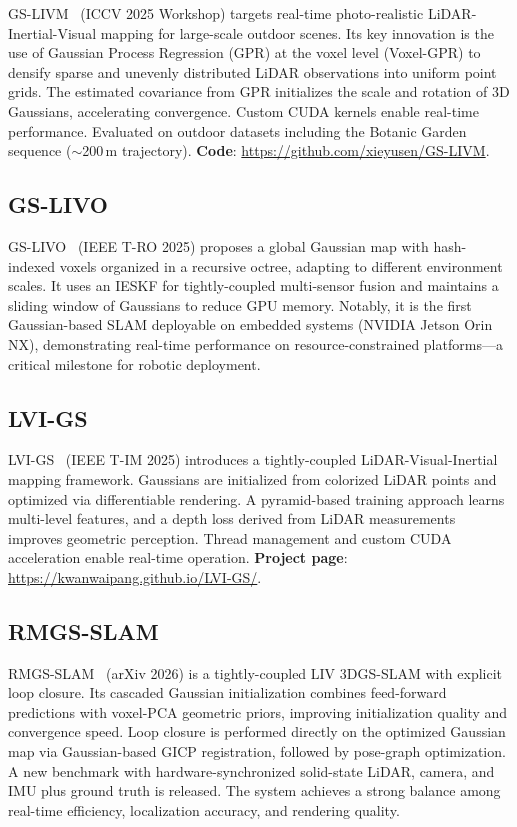 GS-LIVM~\cite{xie2024_gslivm} (ICCV 2025 Workshop) targets real-time
photo-realistic LiDAR-Inertial-Visual mapping for large-scale outdoor
scenes.  Its key innovation is the use of Gaussian Process Regression (GPR)
at the voxel level (Voxel-GPR) to densify sparse and unevenly distributed
LiDAR observations into uniform point grids.  The estimated covariance from
GPR initializes the scale and rotation of 3D Gaussians, accelerating
convergence.  Custom CUDA kernels enable real-time performance.  Evaluated
on outdoor datasets including the Botanic Garden sequence ($\sim$200\,m
trajectory).  \textbf{Code}: \url{https://github.com/xieyusen/GS-LIVM}.

\subsection{GS-LIVO}

GS-LIVO~\cite{hong2025_gslivo} (IEEE T-RO 2025) proposes a global Gaussian
map with hash-indexed voxels organized in a recursive octree, adapting to
different environment scales.  It uses an IESKF for tightly-coupled
multi-sensor fusion and maintains a sliding window of Gaussians to reduce
GPU memory.  Notably, it is the first Gaussian-based SLAM deployable on
embedded systems (NVIDIA Jetson Orin NX), demonstrating real-time performance
on resource-constrained platforms---a critical milestone for robotic
deployment.

\subsection{LVI-GS}

LVI-GS~\cite{zhao2025_lvigs} (IEEE T-IM 2025) introduces a
tightly-coupled LiDAR-Visual-Inertial mapping framework.  Gaussians are
initialized from colorized LiDAR points and optimized via differentiable
rendering.  A pyramid-based training approach learns multi-level features,
and a depth loss derived from LiDAR measurements improves geometric
perception.  Thread management and custom CUDA acceleration enable real-time
operation.  \textbf{Project page}: \url{https://kwanwaipang.github.io/LVI-GS/}.

\subsection{RMGS-SLAM}

RMGS-SLAM~\cite{li2026_rmgs} (arXiv 2026) is a tightly-coupled LIV 3DGS-SLAM
with explicit loop closure.  Its cascaded Gaussian initialization combines
feed-forward predictions with voxel-PCA geometric priors, improving
initialization quality and convergence speed.  Loop closure is performed
directly on the optimized Gaussian map via Gaussian-based GICP registration,
followed by pose-graph optimization.  A new benchmark with
hardware-synchronized solid-state LiDAR, camera, and IMU plus ground truth
is released.  The system achieves a strong balance among real-time
efficiency, localization accuracy, and rendering quality.

